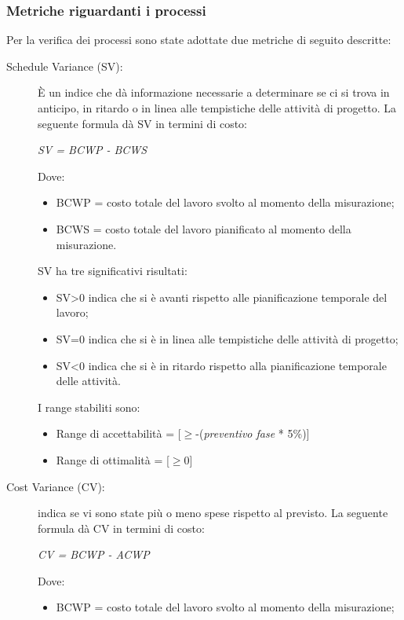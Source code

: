     \subsubsection{Metriche riguardanti i processi}
    Per la verifica dei processi sono state adottate due metriche di seguito descritte:
    \begin{description}
      \item[Schedule Variance (SV):] È un indice che dà informazione necessarie a determinare se ci si trova in anticipo,
      in ritardo o in linea alle tempistiche delle attività di progetto.
      La seguente formula dà SV in termini di costo:
      \begin{center}
        \emph{SV = BCWP - BCWS}
      \end{center}
      Dove:
      \begin{itemize}
        \item BCWP = costo totale del lavoro svolto al momento della misurazione;
        \item BCWS = costo totale del lavoro pianificato al momento della misurazione.
      \end{itemize}
      SV ha tre significativi risultati:
      \begin{itemize}
        \item SV>0 indica che si è avanti rispetto alle pianificazione temporale del lavoro;
        \item SV=0 indica che si è in linea alle tempistiche delle attività di progetto;
        \item SV<0 indica che si è in ritardo rispetto alla pianificazione temporale delle attività.
      \end{itemize}
      I range stabiliti sono:
      \begin{itemize}
        \item Range di accettabilità = [\(\geq\)-(\emph{preventivo fase} * 5\%)]
        \item Range di ottimalità = [\(\geq\)0]
      \end{itemize}
      \item[Cost Variance (CV):] indica se vi sono state più o meno spese rispetto al previsto.
      La seguente formula dà CV in termini di costo:
      \begin{center}
        \emph{CV = BCWP - ACWP}
      \end{center}
      Dove:
      \begin{itemize}
        \item BCWP = costo totale del lavoro svolto al momento della misurazione;

\end{itemize}
\end{description}
